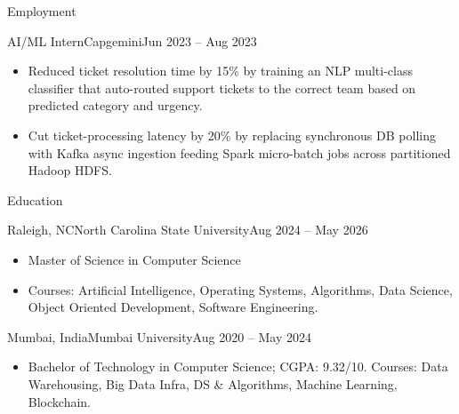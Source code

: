 \documentclass[]{mcdowellcv}
\begin{document}
\begin{cvsection}{Employment}
  \begin{cvsubsection}{AI/ML Intern}{Capgemini}{Jun 2023 -- Aug 2023}
    \begin{itemize}
      \item Reduced ticket resolution time by 15\% by training an NLP multi-class classifier that auto-routed support tickets to the correct team based on predicted category and urgency.
      \item Cut ticket-processing latency by 20\% by replacing synchronous DB polling with Kafka async ingestion feeding Spark micro-batch jobs across partitioned Hadoop HDFS.
    \end{itemize}
    \vspace{-1.5pt}
  \end{cvsubsection}
\end{cvsection}

\begin{cvsection}{Education}
  \begin{cvsubsection}{Raleigh, NC}{North Carolina State University}{Aug 2024 -- May 2026}
    \begin{itemize}
      \item Master of Science in Computer Science
      \item Courses: Artificial Intelligence, Operating Systems, Algorithms, Data Science, Object Oriented Development, Software Engineering.
    \end{itemize}
    \vspace{-1.5pt}
  \end{cvsubsection}

  \begin{cvsubsection}{Mumbai, India}{Mumbai University}{Aug 2020 -- May 2024}
    \begin{itemize}
      \item Bachelor of Technology in Computer Science; CGPA: 9.32/10. Courses: Data Warehousing, Big Data Infra, DS \& Algorithms, Machine Learning, Blockchain.
    \end{itemize}
    \vspace{-1.5pt}
  \end{cvsubsection}
\end{cvsection}
\end{document}
